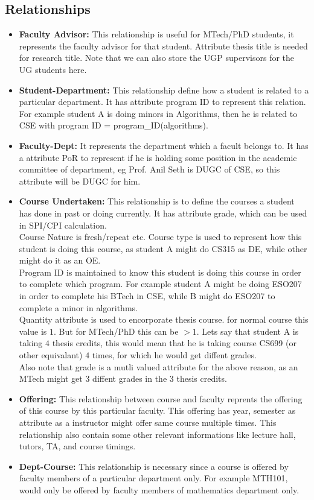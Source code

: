 \documentclass[a4paper]{article}
\begin{document}
\subsection*{Relationships}
\begin{itemize}
	\item{\textbf{Faculty Advisor:}} This relationship is useful for MTech/PhD students, it represents
	the faculty advisor for that student. Attribute thesis title is needed for research title.
	Note that we can also store the UGP supervisors for the UG students here.
	\item{\textbf{Student-Department:}} This relationship define how a student is related to a particular department.
	It has attribute program ID to represent this relation. For example student A is doing minors in
	Algorithms, then he is related to CSE with program ID = program\_ID(algorithms).
	\item{\textbf{Faculty-Dept:}} It represents the department which a facult belongs to. 
	It has a attribute PoR to represent if he is holding some position in the academic committee of department,
	eg Prof. Anil Seth is DUGC of CSE, so this attribute will be DUGC for him.
	\item{\textbf{Course Undertaken:}} This relationship is to define the courses a student has done
	in past or doing currently. It has attribute grade, which can be used in SPI/CPI calculation.\\
	Course Nature is fresh/repeat etc. Course type is used to represent how this student is doing this course,
	as student A might do CS315 as DE, while other might do it as an OE.\\
	Program ID is maintained to know this student is doing this course in order to complete which program.
	For example student A might be doing ESO207 in order to complete his BTech in CSE, while B might do
	ESO207 to complete a minor in algorithms. \\
	Quantity attribute is used to encorporate thesis course. for normal course this value is $1$.
	But for MTech/PhD this can be $>1$. Lets say that student A is taking $4$ thesis credits, this would mean
	that he is taking course CS699 (or other equivalant) $4$ times, for which he would get diffent grades. \\
	Also note that grade is a mutli valued attribute for the above reason, as an MTech might get 3 diffent
	grades in the 3 thesis credits.
	\item{\textbf{Offering:}} This relationship between course and faculty reprents the offering of this
	course by this particular faculty. This offering has year, semester as attribute as a instructor might
	offer same course multiple times. This relationship also contain some other relevant informations like lecture hall,
	tutors, TA, and course timings.
	\item{\textbf{Dept-Course:}} This relationship is necessary since a course is offered by faculty members
	of a particular department only. For example MTH101, would only be offered by faculty members of mathematics department only.


\end{itemize}
\end{document}
